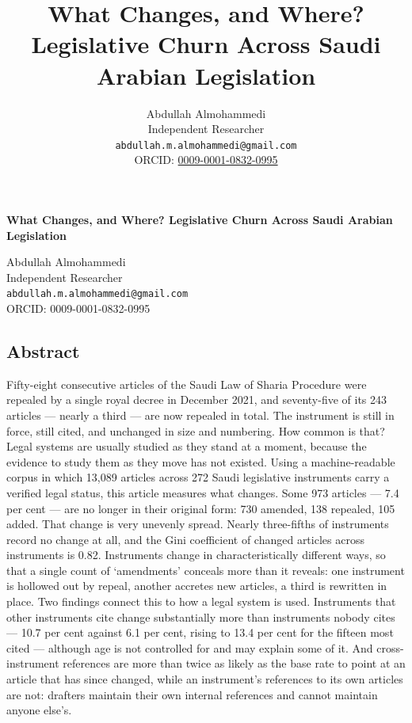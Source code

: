 \documentclass[11pt]{article}
\title{What Changes, and Where?\\
Legislative Churn Across Saudi Arabian Legislation}
\author{Abdullah Almohammedi \\
    Independent Researcher \\
    \texttt{abdullah.m.almohammedi@gmail.com} \\
    ORCID: \href{https://orcid.org/0009-0001-0832-0995}{0009-0001-0832-0995}}
\date{}
\begin{document}
\begin{center}
{\Large\bfseries What Changes, and Where? Legislative Churn Across Saudi Arabian Legislation\par}
\end{center}
\begin{center}
Abdullah Almohammedi\\
Independent Researcher\\
\texttt{abdullah.m.almohammedi@gmail.com}\\
ORCID: 0009-0001-0832-0995
\end{center}
\vspace{1em}


\subsection*{Abstract}

\noindent
Fifty-eight consecutive articles of the Saudi Law of Sharia Procedure were
repealed by a single royal decree in December 2021, and seventy-five of its
243 articles --- nearly a third --- are now repealed in total. The instrument
is still in force, still cited, and unchanged in size and numbering. How
common is that? Legal systems are usually studied as they stand at a moment,
because the evidence to study them as they move has not existed. Using a
machine-readable corpus in which 13,089 articles across 272 Saudi legislative
instruments carry a verified legal status, this article measures what
changes. Some 973 articles --- 7.4 per cent --- are no longer in their
original form: 730 amended, 138 repealed, 105 added. That change is very
unevenly spread. Nearly three-fifths of instruments record no change at all,
and the Gini coefficient of changed articles across instruments is 0.82.
Instruments change in characteristically different ways, so that a single
count of `amendments' conceals more than it reveals: one instrument is
hollowed out by repeal, another accretes new articles, a third is rewritten
in place. Two findings connect this to how a legal system is used. Instruments
that other instruments cite change substantially more than instruments nobody
cites --- 10.7 per cent against 6.1 per cent, rising to 13.4 per cent for the
fifteen most cited --- although age is not controlled for and may explain some
of it. And cross-instrument references are more than twice as likely as the
base rate to point at an article that has since changed, while an instrument's
references to its own articles are not: drafters maintain their own internal
references and cannot maintain anyone else's.
\end{document}
